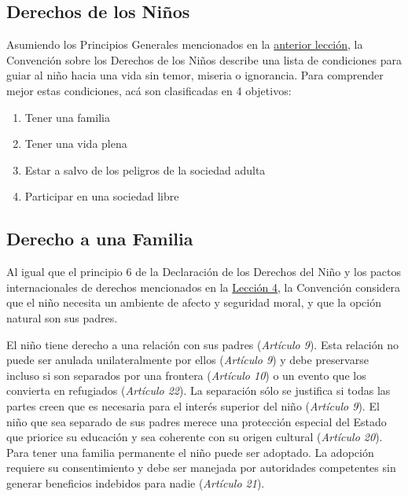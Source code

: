 \documentclass{tufte-handout}
\begin{document}
\subsection{Derechos de los Niños}\label{subsec:derechos}

Asumiendo los Principios Generales mencionados en la \hyperref[subsec:conceptos]{anterior lección}, la Convención sobre los Derechos de los Niños describe una lista de condiciones para guiar al niño hacia una vida sin temor, miseria o ignorancia. Para comprender mejor estas condiciones, acá son clasificadas en 4 objetivos:

\begin{enumerate}
\item{Tener una familia}
\item{Tener una vida plena}
\item{Estar a salvo de los peligros de la sociedad adulta}
\item{Participar en una sociedad libre}
\end{enumerate}

\subsection{Derecho a una Familia}\label{subsec:familia}


Al igual que el principio 6 de la Declaración de los Derechos del Niño y los pactos internacionales de derechos mencionados en la \hyperref[subsec:efecto]{Lección 4}, la Convención considera que el niño necesita un ambiente de afecto y seguridad moral, y que la opción natural son sus padres. 

El niño tiene derecho a una relación con sus padres (\textit{Artículo 9}). Esta relación no puede ser anulada unilateralmente por ellos (\textit{Artículo 9}) y debe preservarse incluso si son separados por una frontera (\textit{Artículo 10}) o un evento que los convierta en refugiados (\textit{Artículo 22}). La separación sólo se justifica si todas las partes creen que es necesaria para el interés superior del niño (\textit{Artículo 9}). El niño que sea separado de sus padres merece una protección especial del Estado que priorice su educación y sea coherente con su origen cultural (\textit{Artículo 20}). Para tener una familia permanente el niño puede ser adoptado. La adopción requiere su consentimiento y debe ser manejada por autoridades competentes sin generar beneficios indebidos para nadie (\textit{Artículo 21}).
\end{document}
